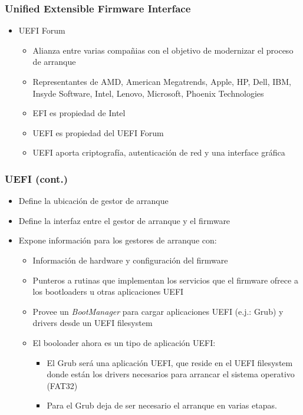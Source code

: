 \begin{frame}
	\frametitle{Unified Extensible Firmware Interface}
	\begin{itemize}
		\item UEFI Forum
		\begin{itemize}
			\item Alianza entre varias compañias con el objetivo de modernizar el proceso de arranque
			\item Representantes de AMD, American Megatrends, Apple, HP, Dell, IBM, Insyde Software, Intel, Lenovo, Microsoft, Phoenix Technologies
			\item EFI es propiedad de Intel
			\item UEFI es propiedad del UEFI Forum
			\item UEFI aporta criptografía, autenticación de red y una interface gráfica
		\end{itemize}
	\end{itemize}
\end{frame}

\begin{frame}
	\frametitle{UEFI (cont.)}
	\begin{itemize}
		\item Define la ubicación de gestor de arranque
		\item Define la interfaz entre el gestor de arranque y el firmware
		\item Expone información para los gestores de arranque con:
		\begin{itemize}
			\item Información de hardware y configuración del firmware
			\item Punteros a rutinas que implementan los servicios que el firmware ofrece a los bootloaders u otras aplicaciones UEFI
			\item Provee un \textit{BootManager} para cargar aplicaciones UEFI (e.j.: Grub) y drivers desde un UEFI filesystem
			\item El booloader ahora es un tipo de aplicación UEFI:
			\begin{itemize}
				\item El Grub será una aplicación UEFI, que reside en el UEFI filesystem donde están los drivers necesarios para arrancar el sistema operativo (FAT32)
				\item Para el Grub deja de ser necesario el arranque en varias etapas.
			\end{itemize}
		\end{itemize}
	\end{itemize}
\end{frame}

